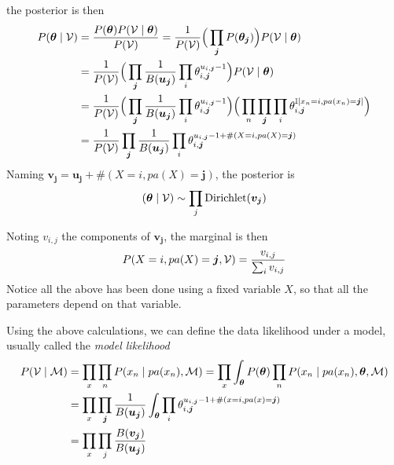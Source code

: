 the posterior is then
\[
  \begin{aligned}
    P(\bm{\theta} \mid \mathcal{V}) &= \frac{P(\bm{\theta})P(\mathcal{V} \mid \bm{\theta}) }{P(\mathcal{V})} = \frac{1}{P(\mathcal{V})}\Big(\prod_{\bm{j}}P(\bm{\theta_{j}}) \Big)P(\mathcal{V} \mid \bm{\theta}) \\
    &= \frac{1}{P(\mathcal{V})}\Big(\prod_{\bm{j}}\frac{1}{B(\bm{u_{j}})}\prod_{i}\theta_{i,\bm{j}}^{u_{i,\bm{j}}-1}\Big) P(\mathcal{V} \mid \bm{\theta})\\
    &= \frac{1}{P(\mathcal{V})}\Big(\prod_{\bm{j}}\frac{1}{B(\bm{u_{j}})}\prod_{i}\theta_{i,\bm{j}}^{u_{i,\bm{j}}-1}\Big) \Big(\prod_{n}\prod_{\bm{j}}\prod_{i} \theta_{i,\bm{j}}^{\mathbb{I}[x_{n} = i, pa(x_{n}) = \bm{j}]}\Big)\\
    &= \frac{1}{P(\mathcal{V})}\prod_{\bm{j}}\frac{1}{B(\bm{u_{j}})}\prod_{i}\theta_{i,\bm{j}}^{u_{i,\bm{j}}-1 + \#(X = i,pa(X)=\bm{j})}
  \end{aligned}
\]
Naming \(\bm{v_{j}} = \bm{u_{j}} + \#(X = i, pa(X) = \bm{j})\), the posterior
is
\[
  (\bm{\theta} \mid \mathcal{V}) \sim \prod_{j}\text{Dirichlet}(\bm{v_{j}})
\]


Noting \(v_{i,j}\) the components of \(\bm{v_{j}}\), the marginal is then
\[
  P(X=i, pa(X) = \bm{j}, \mathcal{V}) = \frac{v_{i,j}}{\sum_{i}v_{i,j}}
\]
Notice all the above has been done using a fixed variable \(X\), so that all the parameters depend on that variable.

Using the above calculations, we can define the data likelihood under a model, usually called the \emph{model likelihood}
\[
  \begin{aligned}
    P(\mathcal{V} \mid \mathcal{M}) &= \prod_{x}\prod_{n}P(x_{n} \mid pa(x_{n}), \mathcal{M}) = \prod_{x} \int_{\bm{\theta}} P(\bm{\theta}) \prod_{n} P(x_{n}\mid pa(x_{n}), \bm{\theta}, \mathcal{M})\\
    &= \prod_{x} \prod_{\bm{j}} \frac{1}{B(\bm{u_{j}})} \int_{\bm{\theta}} \prod_{i}\theta_{i,\bm{j}}^{u_{i,\bm{j}}-1 + \#(x = i,pa(x)=\bm{j})}\\
    &= \prod_{x}\prod_{j} \frac{B(\bm{v_{j}})}{B(\bm{u_{j}})}
  \end{aligned}
\]
